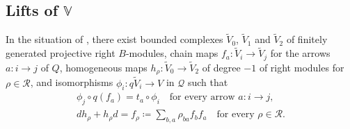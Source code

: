 \subsection{Lifts of \texorpdfstring{$\mathbb{V}$}{V}}
\label{subsec:lifting}

\begin{proposition}
  \label{prop:lifting}
  In the situation of , there exist bounded complexes
  $\widetilde{V}_0$, $\widetilde{V}_1$ and $\widetilde{V}_2$ of finitely
  generated projective right $B$-modules, chain maps
  ${f_a\colon\widetilde{V}_i\to\widetilde{V}_j}$ for the arrows ${a\colon i\to j}$
  of $Q$, homogeneous maps ${h_\rho\colon\widetilde{V}_0\to\widetilde{V}_2}$ of
  degree ${-1}$ of right modules for ${\rho\in\mathcal{R}}$, and isomorphisms
  ${\phi_i\colon q\widetilde{V}_i\to V}$ in $\mathcal{Q}$ such that
  \begin{equation}
    \label{eq:lifting}
    \begin{gathered}
      \phi_j\circ q(f_a)=t_a\circ\phi_i\quad\text{for every arrow }
      a\colon i\to j,\\
      dh_\rho+h_\rho d=f_\rho\coloneqq\sum_{b,a}\rho_{ba}f_bf_a
      \quad\text{for every }\rho\in\mathcal{R}.
    \end{gathered}
  \end{equation}
\end{proposition}

